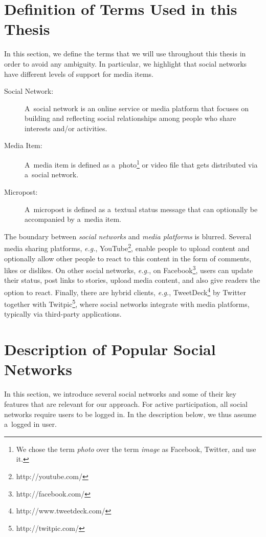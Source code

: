 \section{Definition of Terms Used in this Thesis}
\label{sec:definition}

In this section, we define the terms
that we will use throughout this thesis
in order to avoid any ambiguity.
In particular, we highlight that social networks have
different levels of support for media items.

\begin{description}
  \item[Social Network:]
       A~social network is an online service or media platform
       that focuses on building and reflecting
       social relationships among people
       who share interests and/or activities.
  \item[Media Item:]
       A~media item is defined as
       a~photo\footnote{We chose the term \emph{photo}
       over the term \emph{image} as 
       Facebook, Twitter, and \googleplus use it.}
       or video
       file that gets distributed via a~social network.
  \item[Micropost:]
       A~micropost is defined as a~textual status message
       that can optionally be accompanied by a~media item.
\end{description}

The boundary between \emph{social networks} and
\emph{media platforms} is blurred.
Several media sharing platforms, \emph{e.g.},
YouTube\footnote{http://youtube.com/},
enable people to upload content
and optionally allow other people to react
to this content in the form of comments, likes or dislikes.
On other social networks, \emph{e.g.},
on Facebook\footnote{http://facebook.com/},
users can update their status, post links to stories,
upload media content, and also give readers the option to react.
Finally, there are hybrid clients, \emph{e.g.},
TweetDeck\footnote{http://www.tweetdeck.com/}
by Twitter together with
Twitpic\footnote{http://twitpic.com/},
where social networks integrate with media platforms,
typically via third-party applications.

\section{Description of Popular Social Networks}
\label{sec:description-of-popular-social-networks}

In this section, we introduce several social networks
and some of their key features
that are relevant for our approach.
For active participation,
all social networks require users to be logged in.
In the description below, we thus assume a~logged in user.


